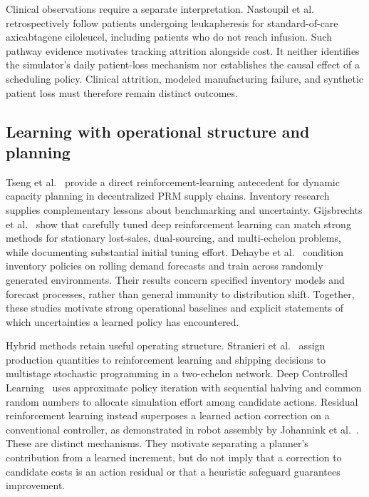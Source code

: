 Clinical observations require a separate interpretation. Nastoupil et al.~\cite{Nastoupil2020} retrospectively follow patients undergoing leukapheresis for standard-of-care axicabtagene ciloleucel, including patients who do not reach infusion. Such pathway evidence motivates tracking attrition alongside cost. It neither identifies the simulator's daily patient-loss mechanism nor establishes the causal effect of a scheduling policy. Clinical attrition, modeled manufacturing failure, and synthetic patient loss must therefore remain distinct outcomes.

\subsection{Learning with operational structure and planning}
Tseng et al.~\cite{Tseng2025} provide a direct reinforcement-learning antecedent for dynamic capacity planning in decentralized PRM supply chains. Inventory research supplies complementary lessons about benchmarking and uncertainty. Gijsbrechts et al.~\cite{Gijsbrechts2022InventoryDRL} show that carefully tuned deep reinforcement learning can match strong methods for stationary lost-sales, dual-sourcing, and multi-echelon problems, while documenting substantial initial tuning effort. Dehaybe et al.~\cite{Dehaybe2024NonstationaryInventory} condition inventory policies on rolling demand forecasts and train across randomly generated environments. Their results concern specified inventory models and forecast processes, rather than general immunity to distribution shift. Together, these studies motivate strong operational baselines and explicit statements of which uncertainties a learned policy has encountered.

Hybrid methods retain useful operating structure. Stranieri et al.~\cite{Stranieri2024HybridInventory} assign production quantities to reinforcement learning and shipping decisions to multistage stochastic programming in a two-echelon network. Deep Controlled Learning~\cite{Temizoz2025DeepControlledLearning} uses approximate policy iteration with sequential halving and common random numbers to allocate simulation effort among candidate actions. Residual reinforcement learning instead superposes a learned action correction on a conventional controller, as demonstrated in robot assembly by Johannink et al.~\cite{Johannink2019ResidualRL}. These are distinct mechanisms. They motivate separating a planner's contribution from a learned increment, but do not imply that a correction to candidate costs is an action residual or that a heuristic safeguard guarantees improvement.


